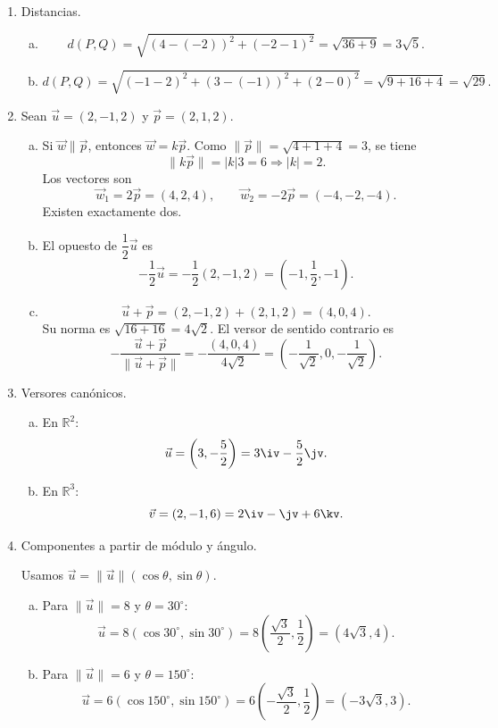 \begin{enumerate}[\hspace{-3mm}$1)$]
\item Distancias.
\begin{sol}
\begin{enumerate}[a)]
\item
\[
d(P,Q)=\sqrt{(4-(-2))^2+(-2-1)^2}=\sqrt{36+9}=3\sqrt5.
\]
\item
\[
d(P,Q)=\sqrt{(-1-2)^2+(3-(-1))^2+(2-0)^2}=\sqrt{9+16+4}=\sqrt{29}.
\]
\end{enumerate}
\end{sol}

\item Sean $\vec u=(2,-1,2)$ y $\vec p=(2,1,2)$.
\begin{sol}
\begin{enumerate}[a)]
\item Si $\vec w\parallel \vec p$, entonces $\vec w=k\vec p$. Como $\|\vec p\|=\sqrt{4+1+4}=3$, se tiene
\[
\|k\vec p\|=|k|3=6\Rightarrow |k|=2.
\]
Los vectores son
\[
\vec w_1=2\vec p=(4,2,4),\qquad \vec w_2=-2\vec p=(-4,-2,-4).
\]
Existen exactamente dos.
\item El opuesto de $\dfrac12\vec u$ es
\[
-\frac12\vec u=-\frac12(2,-1,2)=\left(-1,\frac12,-1\right).
\]
\item
\[
\vec u+\vec p=(2,-1,2)+(2,1,2)=(4,0,4).
\]
Su norma es $\sqrt{16+16}=4\sqrt2$. El versor de sentido contrario es
\[
-\frac{\vec u+\vec p}{\|\vec u+\vec p\|}=-\frac{(4,0,4)}{4\sqrt2}=\left(-\frac1{\sqrt2},0,-\frac1{\sqrt2}\right).
\]
\end{enumerate}
\end{sol}

\item Versores canónicos.
\begin{sol}
\begin{enumerate}[a)]
\item En $\mathbb R^2$:
\[
\vec u=\left(3,-\frac52\right)=3\iv-\frac52\jv.
\]
\item En $\mathbb R^3$:
\[
\vec v=(2,-1,6)=2\iv-\jv+6\kv.
\]
\end{enumerate}
\end{sol}

\item Componentes a partir de módulo y ángulo.
\begin{sol}
Usamos $\vec u=\|\vec u\|(\cos\theta,\sin\theta)$.
\begin{enumerate}[a)]
\item Para $\|\vec u\|=8$ y $\theta=30^\circ$:
\[
\vec u=8\left(\cos30^\circ,\sin30^\circ\right)=8\left(\frac{\sqrt3}{2},\frac12\right)=(4\sqrt3,4).
\]
\item Para $\|\vec u\|=6$ y $\theta=150^\circ$:
\[
\vec u=6\left(\cos150^\circ,\sin150^\circ\right)=6\left(-\frac{\sqrt3}{2},\frac12\right)=(-3\sqrt3,3).
\]
\end{enumerate}
\begin{center}
\end{center}
\end{sol}


\end{enumerate}
